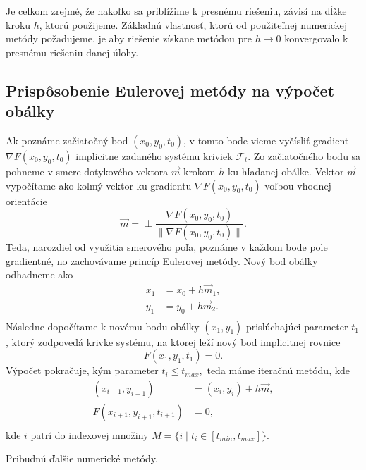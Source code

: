Je celkom zrejmé, že nakoľko sa priblížime k presnému riešeniu, závisí na dĺžke kroku $h$, ktorú použijeme. Základnú vlastnosť, ktorú od použiteľnej numerickej metódy požadujeme, je aby riešenie získane metódou pre $h \rightarrow 0$ konvergovalo k presnému riešeniu danej úlohy.
 
\subsection{Prispôsobenie Eulerovej metódy na výpočet obálky}
Ak poznáme začiatočný bod $(x_0,y_0,t_0)$, v tomto bode vieme vyčísliť gradient $\nabla F(x_0, y_0, t_0)$ implicitne zadaného systému kriviek $\mathcal{F}_t$. Zo začiatočného bodu sa pohneme v smere dotykového vektora $\vec{m}$ krokom $h$ ku hľadanej obálke. Vektor $\vec{m}$ vypočítame ako kolmý vektor ku gradientu $\nabla F(x_0, y_0, t_0)$ voľbou vhodnej orientácie  
$$\vec{m} = \perp \dfrac{\nabla F(x_0, y_0, t_0)}{\| \nabla F(x_0, y_0, t_0)\|}.$$ 
Teda, narozdiel od využitia smerového poľa, poznáme v každom bode pole gradientné, no zachovávame princíp Eulerovej metódy. Nový bod obálky odhadneme ako
\begin{align*}
x_1 &= x_0 + h \vec{m}_{1}, \\
y_1 &= y_0 + h \vec{m}_{2}. \\
\end{align*} 
Následne dopočítame k novému bodu obálky $(x_1, y_1)$ prislúchajúci parameter $t_1$, ktorý zodpovedá krivke systému, na ktorej leží nový bod implicitnej rovnice $$F(x_1, y_1, t_1) = 0.$$
Výpočet pokračuje, kým parameter $t_i \leq t_{max},$ teda máme iteračnú metódu, kde
\begin{align*}
(x_{i+1}, y_{i+1}) &= (x_i, y_i)+ h \vec{m}, \\
F(x_{i+1}, y_{i+1}, t_{i+1}) &= 0, \\
\end{align*} 
kde $i$ patrí do indexovej množiny $M = \{ i \mid t_{i} \in [t_{min},t_{max}] \}.$

Pribudnú ďalšie numerické metódy.